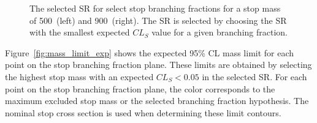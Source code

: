 \begin{figure}[ht]
  \centering
  \caption{
    The selected SR for select stop branching fractions for a stop mass of
    500~\GeV (left) and 900~\GeV (right).
    The SR is selected by choosing the SR with the smallest expected $CL_S$
    value for a given branching fraction.
  }
  \label{fig:sr_selection}
\end{figure}

Figure~\ref{fig:mass_limit_exp} shows the expected 95\% CL mass limit for each
point on the stop branching fraction plane.
These limits are obtained by selecting the highest stop mass with an expected
$CL_S < 0.05$ in the selected SR.
For each point on the stop branching fraction plane, the color corresponds to the
maximum excluded stop mass or the selected branching fraction hypothesis.
The nominal stop cross section is used when determining these limit contours.

